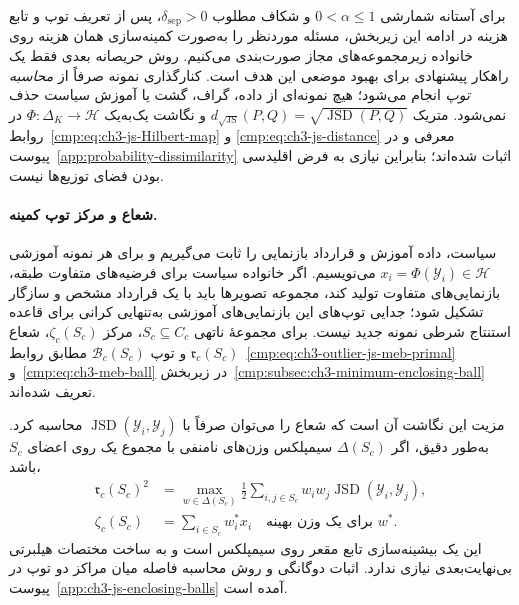 برای آستانه شمارشی
$0<\alpha\le1$ و شکاف مطلوب
$\delta_{\mathrm{sep}}>0$،
پس از تعریف توپ و تابع هزینه
در ادامه این زیربخش، مسئله
موردنظر را به‌صورت کمینه‌سازی
همان هزینه روی خانواده
زیرمجموعه‌های مجاز صورت‌بندی
می‌کنیم. روش حریصانه بعدی
فقط یک راهکار پیشنهادی
برای بهبود موضعی این هدف است.
کنارگذاری نمونه صرفاً
از \emph{محاسبه توپ} انجام
می‌شود؛ هیچ نمونه‌ای از
داده، گراف، گشت یا آموزش
سیاست حذف نمی‌شود.
متریک
$d_{\sqrt{\mathrm{JS}}}(P,Q)=\sqrt{\operatorname{JSD}(P,Q)}$
و نگاشت یک‌به‌یک
$\Phi:\Delta_K\to\mathcal H$
در روابط~\eqref{cmp:eq:ch3-js-Hilbert-map} و
\eqref{cmp:eq:ch3-js-distance} معرفی و
در پیوست~\ref{app:probability-dissimilarity}
اثبات شده‌اند؛ بنابراین نیازی به
فرض اقلیدسی بودن فضای توزیع‌ها نیست.

\paragraph{شعاع و مرکز توپ کمینه.}
سیاست، داده آموزش و قرارداد بازنمایی را
ثابت می‌گیریم و برای هر نمونه آموزشی
$x_i=\Phi(\mathscr Y_i)\in\mathcal H$
می‌نویسیم. اگر خانواده سیاست برای
فرضیه‌های متفاوت طبقه، بازنمایی‌های
متفاوت تولید کند، مجموعه تصویرها باید
با یک قرارداد مشخص و سازگار تشکیل شود؛
جدایی توپ‌های این بازنمایی‌های آموزشی
به‌تنهایی کرانی برای قاعده استنتاج
شرطی نمونه جدید نیست.  برای مجموعهٔ ناتهی
$S_c\subseteq C_c$، مرکز $\zeta_c(S_c)$،
شعاع $\mathfrak r_c(S_c)$ و توپ
$\mathcal B_c(S_c)$ مطابق
روابط~\eqref{cmp:eq:ch3-outlier-js-meb-primal}
و~\eqref{cmp:eq:ch3-meb-ball} در
زیربخش~\ref{cmp:subsec:ch3-minimum-enclosing-ball}
تعریف شده‌اند.

مزیت این نگاشت آن است که شعاع
را می‌توان صرفاً با
$\operatorname{JSD}(\mathscr Y_i,\mathscr Y_j)$
محاسبه کرد. به‌طور دقیق، اگر
$\Delta(S_c)$ سیمپلکس وزن‌های
نامنفی با مجموع یک روی اعضای $S_c$ باشد،
\begin{equation}\label{cmp:eq:ch3-outlier-js-meb-dual}
\boxed{
\begin{aligned}
\mathfrak r_c(S_c)^2
&=\max_{w\in\Delta(S_c)}
\frac12\sum_{i,j\in S_c}w_iw_j
\operatorname{JSD}(\mathscr Y_i,\mathscr Y_j),\\
\zeta_c(S_c)
&=\sum_{i\in S_c}w_i^*x_i
\quad\text{برای یک وزن بهینه }w^*.
\end{aligned}}
\end{equation}
این یک بیشینه‌سازی تابع مقعر
روی سیمپلکس است و به ساخت
مختصات هیلبرتی بی‌نهایت‌بعدی
نیازی ندارد. اثبات دوگانگی و
روش محاسبه فاصله میان مراکز
دو توپ در
پیوست~\ref{app:ch3-js-enclosing-balls}
آمده است.

